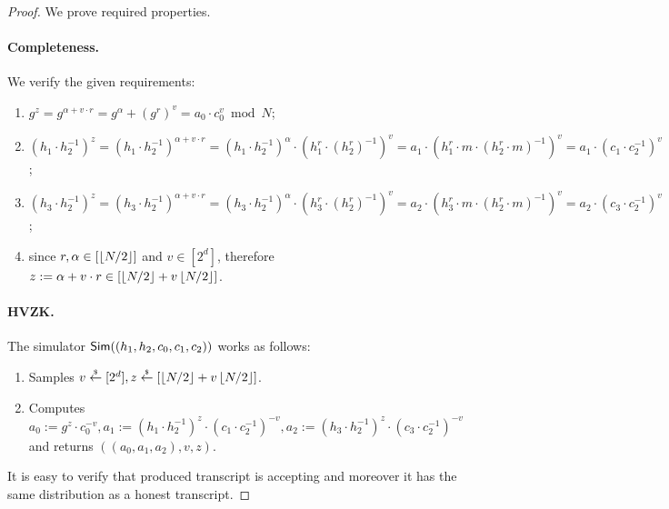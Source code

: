 \begin{proof} 
We prove required properties. 

\paragraph{Completeness.} We verify the given requirements:
\begin{enumerate}
\item $g^z = g^{\alpha + v \cdot r} = g^\alpha + (g^r)^v = a_0 \cdot c_0^v \bmod N$;
\item $(h_1\cdot h_2^{-1})^z = (h_1\cdot h_2^{-1})^{\alpha + v \cdot r} = (h_1\cdot h_2^{-1})^\alpha \cdot (h_1^r\cdot (h_2^r)^{-1})^v = a_1 \cdot (h_1^r \cdot m \cdot (h_2^r \cdot m)^{-1})^v = a_1 \cdot (c_1\cdot c_2^{-1})^v$;
\item $(h_3\cdot h_2^{-1})^z = (h_3\cdot h_2^{-1})^{\alpha + v \cdot r} = (h_3\cdot h_2^{-1})^\alpha \cdot (h_3^r\cdot (h_2^r)^{-1})^v = a_2 \cdot (h_3^r \cdot m \cdot (h_2^r \cdot m)^{-1})^v = a_2 \cdot (c_3\cdot c_2^{-1})^v$;
\item since $r, \alpha \in [\left\lfloor N/2 \right\rfloor]$ and $v \in [2^d]$, therefore $z:= \alpha + v \cdot r \in [ \left\lfloor N/2 \right\rfloor + v\left\lfloor N/2 \right\rfloor]$. 
\end{enumerate}

\paragraph{HVZK.} The simulator $\mathsf{Sim}((h_1, h_2, c_0, c_1, c_2))$ works as follows:
\begin{enumerate}
\item Samples $v \stackrel{{\scriptscriptstyle\$}}{\leftarrow} [2^d], z \stackrel{{\scriptscriptstyle\$}}{\leftarrow} [\left\lfloor N/2 \right\rfloor + v\left\lfloor N/2 \right\rfloor]$.
\item Computes $a_0:= g^z \cdot c_0^{-v}, a_1:= (h_1 \cdot h_2^{-1})^z \cdot (c_1 \cdot c_2^{-1})^{-v}, a_2:= (h_3 \cdot h_2^{-1})^z \cdot (c_3 \cdot c_2^{-1})^{-v}$ and returns $((a_0, a_1, a_2), v, z)$.
\end{enumerate}
It is easy to verify that produced transcript is accepting and moreover it has the same distribution as a honest transcript. 



\end{proof}
